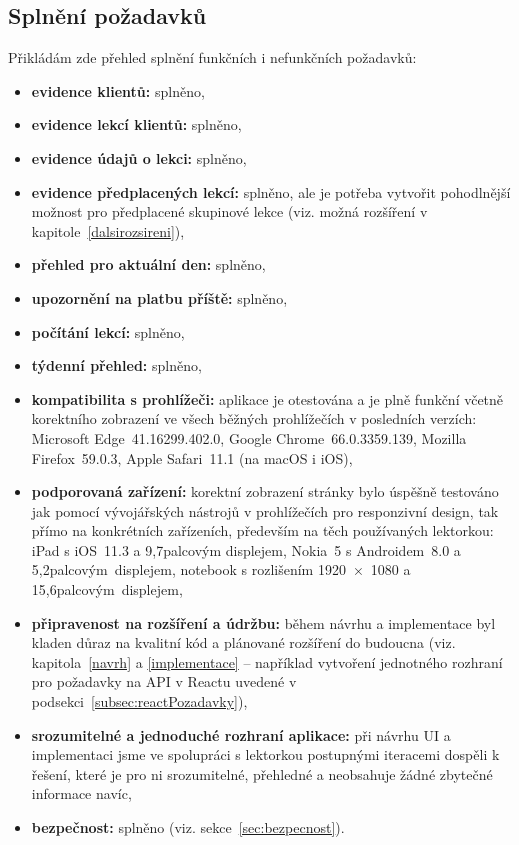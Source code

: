         \subsection{Splnění požadavků}
        Přikládám zde přehled splnění funkčních i nefunkčních požadavků:
        \begin{itemize}
            \item \textbf{evidence klientů:} splněno,
            \item \textbf{evidence lekcí klientů:} splněno,
            \item \textbf{evidence údajů o lekci:} splněno,
            \item \textbf{evidence předplacených lekcí:} splněno, ale je potřeba vytvořit pohodlnější možnost pro předplacené skupinové lekce (viz. možná rozšíření v kapitole~\ref{dalsirozsireni}),
            \item \textbf{přehled pro aktuální den:} splněno,
            \item \textbf{upozornění na platbu příště:} splněno,
            \item \textbf{počítání lekcí:} splněno,
            \item \textbf{týdenní přehled:} splněno,
            \item \textbf{kompatibilita s prohlížeči:} aplikace je otestována a je plně funkční včetně korektního zobrazení ve všech běžných prohlížečích v posledních verzích: Microsoft Edge~41.16299.402.0, Google Chrome~66.0.3359.139, Mozilla Firefox~59.0.3, Apple Safari~11.1 (na macOS i iOS),
            \item \textbf{podporovaná zařízení:} korektní zobrazení stránky bylo úspěšně testováno jak pomocí vývojářských nástrojů v prohlížečích pro responzivní design, tak přímo na konkrétních zařízeních, především na těch používaných lektorkou: iPad s iOS~11.3 a 9,7palcovým displejem, Nokia~5 s Androidem~8.0 a 5,2palcovým~displejem, notebook s rozlišením 1920~×~1080 a 15,6palcovým~displejem,
            \item \textbf{připravenost na rozšíření a údržbu:} během návrhu a implementace byl kladen důraz na kvalitní kód a plánované rozšíření do budoucna (viz. kapitola~\ref{navrh} a \ref{implementace} -- například vytvoření jednotného rozhraní pro požadavky na API v Reactu uvedené v podsekci~\ref{subsec:reactPozadavky}),
            \item \textbf{srozumitelné a jednoduché rozhraní aplikace:} při návrhu UI a implementaci jsme ve spolupráci s lektorkou postupnými iteracemi dospěli k řešení, které je pro ni srozumitelné, přehledné a neobsahuje žádné zbytečné informace navíc,
            \item \textbf{bezpečnost:} splněno (viz. sekce~\ref{sec:bezpecnost}).
        \end{itemize}
        
